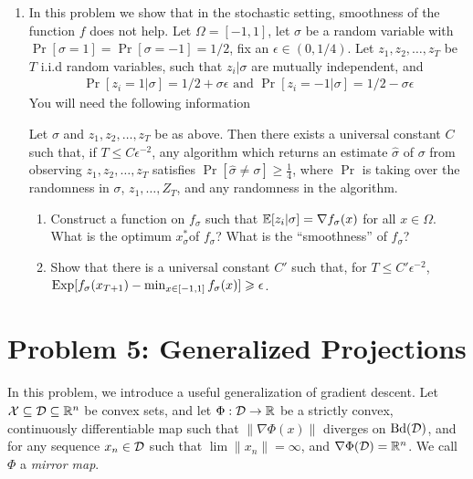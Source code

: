 \documentclass[12pt]{article}
\begin{document}
\begin{enumerate}
\item 
In this problem we show that in the stochastic setting, smoothness of the function $f$ does not help. Let $\Omega = [-1,1]$, let $\sigma$ be a random variable with $\Pr[\sigma = 1] = \Pr[\sigma = -1] = 1/2$, fix an $\epsilon \in (0,1/4)$. Let $z_1,z_2,\dots,z_T$ be $T$ i.i.d random variables, such that $z_i | \sigma$ are mutually independent, and 
\begin{eqnarray}
\Pr[z_i =  1 | \sigma] = 1/2 + \sigma \epsilon \text{ and } \Pr[z_i =  -1 | \sigma] = 1/2 - \sigma \epsilon 
\end{eqnarray}
You will need the following information
\begin{lemma*} Let $\sigma$ and $z_1,z_2,\dots,z_T$ be as above. Then there exists a universal constant $C$ such that, if $T \le C \epsilon^{-2}$, any algorithm which returns an estimate $\widehat{\sigma}$ of $\sigma$ from observing $z_1,z_2,\dots,z_T$ satisfies $\Pr[\widehat{\sigma} \ne \sigma] \ge \frac{1}{4}$, where $\Pr$ is taking over the randomness in $\sigma$, $z_1,\dots,Z_T$, and any randomness in the algorithm. 
\end{lemma*}
\begin{enumerate}
\item
Construct a function on $f_{\sigma}$ such that $\operatorname*{\mathbb{E}}[z_i | \sigma] = \nabla f_{\sigma}(x)$ for all $x \in \Omega$. What is the optimum $x^*_{\sigma} $of $f_{\sigma}$? What is the ``smoothness'' of $f_{\sigma}$?
\item 
Show that there is a universal constant $C'$ such that, for $T \le C'\epsilon^{-2}$, $\mathrm{Exp}[f_{\sigma}(x_{T+1}) - \min_{x \in [-1,1]}f_{\sigma}(x)] \geqslant \epsilon$. 
\end{enumerate}
\end{enumerate}
\section*{Problem 5: Generalized Projections}

In this problem, we introduce a useful generalization of gradient descent. Let
${\cal X} \subseteq {\cal D} \subseteq \mathbb{R}^n$ be convex sets, and let $\Phi: {\cal D} \to \mathbb{R}$ be
a strictly convex, continuously differentiable map such that $\|\nabla
\Phi(x)\|$ diverges on $\mathrm{Bd}({\cal D})$, and for any sequence $x_n \in {\cal D}$ such that $\lim \|x_n\| = \infty$, and $\nabla \Phi({\cal D}) = \mathbb{R}^n$. We call $\Phi$ a \emph{mirror map}.
\end{document}
